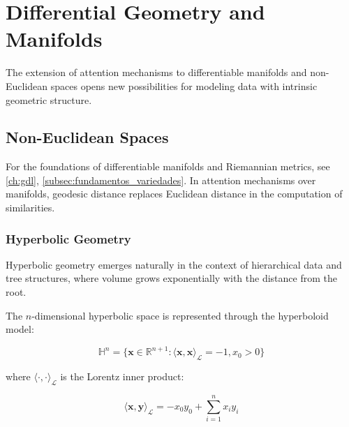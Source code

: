 \section{Differential Geometry and Manifolds}\label{sec:differential_geometry_attention}

The extension of attention mechanisms to differentiable manifolds and non-Euclidean spaces opens new possibilities for modeling data with intrinsic geometric structure.

\subsection{Non-Euclidean Spaces}

For the foundations of differentiable manifolds and Riemannian metrics, see \autoref{ch:gdl}, \autoref{subsec:fundamentos_variedades}. In attention mechanisms over manifolds, geodesic distance replaces Euclidean distance in the computation of similarities.

\subsubsection{Hyperbolic Geometry}

Hyperbolic geometry emerges naturally in the context of hierarchical data and tree structures, where volume grows exponentially with the distance from the root.

\begin{definition}\label{def:espacio_hiperbolico_hiperboloide}
The $n$-dimensional hyperbolic space is represented through the hyperboloid model:

\begin{equation}
    \mathbb{H}^n = \{\mathbf{x} \in \mathbb{R}^{n+1} : \langle \mathbf{x}, \mathbf{x} \rangle_{\mathcal{L}} = -1, x_0 > 0\}
    \label{eq:hyperboloid_model}
\end{equation}

where $\langle \cdot, \cdot \rangle_{\mathcal{L}}$ is the Lorentz inner product:

\begin{equation}
    \langle \mathbf{x}, \mathbf{y} \rangle_{\mathcal{L}} = -x_0y_0 + \sum_{i=1}^{n} x_iy_i
    \label{eq:lorentz_inner_product}
\end{equation}
\end{definition}

